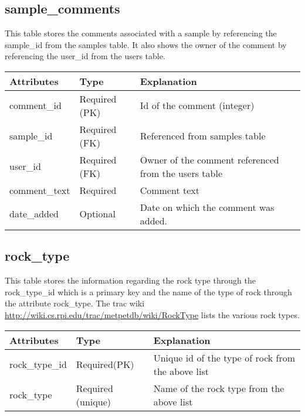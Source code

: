 \documentclass[letterpaper,10pt,english]{sphinxmanual}
\begin{document}
\subsection{sample\_comments}
\label{Table_Description:sample-comments}
This table stores the comments associated with a sample by referencing the sample\_id from the samples table. It also shows the owner of the comment by referencing the user\_id from the users table.

\begin{tabulary}{\linewidth}{|L|L|L|}
\hline
\textbf{
Attributes
} & \textbf{
Type
} & \textbf{
Explanation
}\\\hline

comment\_id
 & 
Required (PK)
 & 
Id of the comment (integer)
\\\hline

sample\_id
 & 
Required (FK)
 & 
Referenced from samples table
\\\hline

user\_id
 & 
Required (FK)
 & 
Owner of the comment referenced from the users table
\\\hline

comment\_text
 & 
Required
 & 
Comment text
\\\hline

date\_added
 & 
Optional
 & 
Date on which the comment was added.
\\\hline
\end{tabulary}



\subsection{rock\_type}
\label{Table_Description:rock-type}
This table stores the information regarding the rock type through the rock\_type\_id which is a primary key and the name of the type of rock through the attribute rock\_type.
The trac wiki \href{http://wiki.cs.rpi.edu/trac/metpetdb/wiki/RockType}{http://wiki.cs.rpi.edu/trac/metpetdb/wiki/RockType} lists the various rock types.

\begin{tabulary}{\linewidth}{|L|L|L|}
\hline
\textbf{
Attributes
} & \textbf{
Type
} & \textbf{
Explanation
}\\\hline

rock\_type\_id
 & 
Required(PK)
 & 
Unique id of the type of rock from the above list
\\\hline

rock\_type
 & 
Required (unique)
 & 
Name of the rock type from the above list
\\\hline
\end{tabulary}
\end{document}
